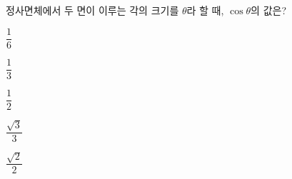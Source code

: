 정사면체에서 두 면이 이루는 각의 크기를 $\theta$라 할 때, $\cos\theta$의 값은?
\begin{choices32}{\rule[-3ex]{0pt}{8ex}$\dfrac{1}{6}$}{\rule[-3ex]{0pt}{8ex}$\dfrac{1}{3}$}{\rule[-3ex]{0pt}{8ex}$\dfrac{1}{2}$}{\rule[-3ex]{0pt}{8ex}$\dfrac{\sqrt{3}}{3}$}{\rule[-3ex]{0pt}{8ex}$\dfrac{\sqrt{2}}{2}$}\end{choices32}
